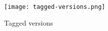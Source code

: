 \begin{figure}[H]
    \centering
    \texttt{[image: tagged-versions.png]}
    \caption{Tagged versions}\label{fig:tagged_versions}
\end{figure}